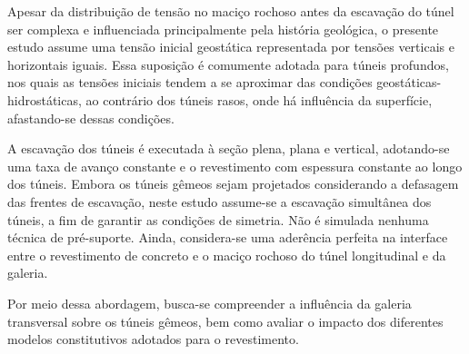 Apesar da distribuição de tensão no maciço rochoso antes da escavação do túnel ser complexa e influenciada principalmente pela história geológica, o presente estudo assume uma tensão inicial geostática representada por tensões verticais e horizontais iguais. Essa suposição é comumente adotada para túneis profundos, nos quais as tensões iniciais tendem a se aproximar das condições geostáticas-hidrostáticas, ao contrário dos túneis rasos, onde há influência da superfície, afastando-se dessas condições. 

A escavação dos túneis é executada à seção plena, plana e vertical, adotando-se uma taxa de avanço constante e o revestimento com espessura constante ao longo dos túneis. Embora os túneis gêmeos sejam projetados considerando a defasagem das frentes de escavação, neste estudo assume-se a escavação simultânea dos túneis, a fim de garantir as condições de simetria. Não é simulada nenhuma técnica de pré-suporte. Ainda, considera-se uma aderência perfeita na interface entre o revestimento de concreto e o maciço rochoso do túnel longitudinal e da galeria.

Por meio dessa abordagem, busca-se compreender a influência da galeria transversal sobre os túneis gêmeos, bem como avaliar o impacto dos diferentes modelos constitutivos adotados para o revestimento.



